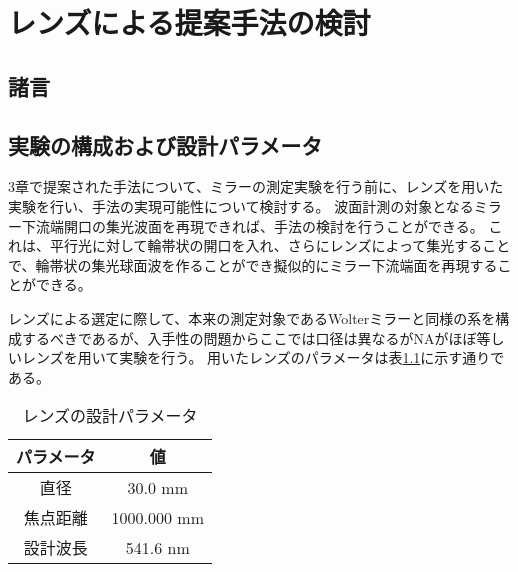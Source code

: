 \chapter{レンズによる提案手法の検討}
\thispagestyle{empty}
\label{chap4}
\graphicspath{{chap4/figure/}}
\minitoc

\newpage


\section{諸言}
\label{chap4_introduction}


\clearpage
\newpage

\section{実験の構成および設計パラメータ}
3章で提案された手法について、ミラーの測定実験を行う前に、レンズを用いた実験を行い、手法の実現可能性について検討する。
波面計測の対象となるミラー下流端開口の集光波面を再現できれば、手法の検討を行うことができる。
これは、平行光に対して輪帯状の開口を入れ、さらにレンズによって集光することで、輪帯状の集光球面波を作ることができ擬似的にミラー下流端面を再現することができる。

レンズによる選定に際して、本来の測定対象であるWolterミラーと同様の系を構成するべきであるが、入手性の問題からここでは口径は異なるがNAがほぼ等しいレンズを用いて実験を行う。
用いたレンズのパラメータは表\ref{tb:focusing_lens_params}に示す通りである。

\begin{table}[h]
\begin{center}
  \begin{tabular}{|c|c|} \hline
    パラメータ & 値 \\ \hline
    直径 & 30.0 mm  \\
    焦点距離 & 1000.000 mm \\
    設計波長 & 541.6 nm \\ \hline
  \end{tabular}
  \caption{レンズの設計パラメータ}
  \label{tb:focusing_lens_params}
\end{center}
\end{table}

